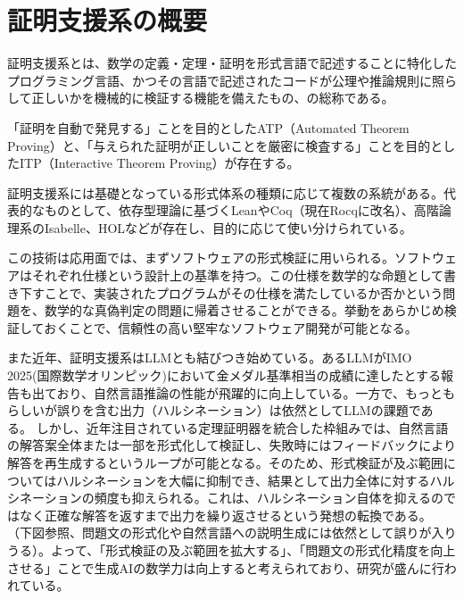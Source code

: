 \documentclass[a4paper,12pt]{bxjsbook}
\newlength{\customindent}
\newenvironment{body}{
  \par
  \begingroup
  \setlength{\leftskip}{\customindent}
  \setlength{\rightskip}{0pt}
  \setlength{\parindent}{1em}
  \setlength{\displayindent}{\customindent}
  \setlength{\displaywidth}{\dimexpr\linewidth-\customindent\relax}
}{
  \par
  \endgroup
}
\theoremstyle{theorem}
\begin{document}
    \section{証明支援系の概要}
    \begin{body}
        \indent 証明支援系とは、数学の定義・定理・証明を形式言語で記述することに特化したプログラミング言語、かつその言語で記述されたコードが公理や推論規則に照らして正しいかを機械的に検証する機能を備えたもの、の総称である。
        
        \indent 「証明を自動で発見する」ことを目的としたATP（Automated Theorem Proving）と、「与えられた証明が正しいことを厳密に検査する」ことを目的としたITP（Interactive Theorem Proving）が存在する。

        \indent 証明支援系には基礎となっている形式体系の種類に応じて複数の系統がある。代表的なものとして、依存型理論に基づくLeanやCoq（現在Rocqに改名）、高階論理系のIsabelle、HOLなどが存在し、目的に応じて使い分けられている。

        \indent この技術は応用面では、まずソフトウェアの形式検証に用いられる。ソフトウェアはそれぞれ仕様という設計上の基準を持つ。この仕様を数学的な命題として書き下すことで、実装されたプログラムがその仕様を満たしているか否かという問題を、数学的な真偽判定の問題に帰着させることができる。挙動をあらかじめ検証しておくことで、信頼性の高い堅牢なソフトウェア開発が可能となる。

        \indent また近年、証明支援系はLLMとも結びつき始めている。あるLLMがIMO 2025(国際数学オリンピック)において金メダル基準相当の成績に達したとする報告も出ており\cite{DeepMindIMO2025}、自然言語推論の性能が飛躍的に向上している。一方で、もっともらしいが誤りを含む出力（ハルシネーション）は依然としてLLMの課題である。
        しかし、近年注目されている定理証明器を統合した枠組みでは、自然言語の解答案全体または一部を形式化して検証し、失敗時にはフィードバックにより解答を再生成するというループが可能となる。そのため、形式検証が及ぶ範囲についてはハルシネーションを大幅に抑制でき、結果として出力全体に対するハルシネーションの頻度も抑えられる。これは、ハルシネーション自体を抑えるのではなく正確な解答を返すまで出力を繰り返させるという発想の転換である。
        （下図参照、問題文の形式化や自然言語への説明生成には依然として誤りが入りうる）。よって、「形式検証の及ぶ範囲を拡大する」、「問題文の形式化精度を向上させる」ことで生成AIの数学力は向上すると考えられており、研究が盛んに行われている。

    \end{body}
\end{document}
